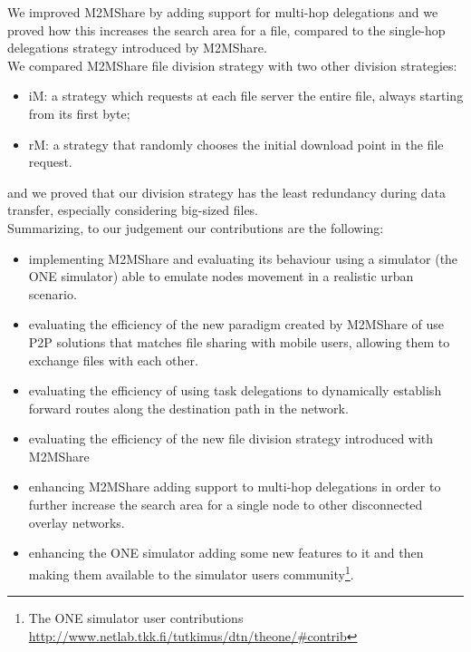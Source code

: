 We improved M2MShare by adding support for multi-hop delegations and we proved how this increases the search area for a file, compared to the single-hop delegations strategy introduced by M2MShare.
\\

We compared M2MShare file division strategy with two other division strategies:
\begin{itemize}
\item iM: a strategy which requests at each file server the entire file, always starting from its first byte;
\item rM: a strategy that randomly chooses the initial download point in the file request.
\end{itemize}
and we proved that our division strategy has the least redundancy during data transfer, especially considering big-sized files.
\\

Summarizing, to our judgement our contributions are the following:
\begin{itemize}
\item implementing M2MShare and evaluating its behaviour using a simulator (the ONE simulator) able to emulate nodes movement in a realistic urban scenario.
\item evaluating the efficiency of the new paradigm created by M2MShare of use P2P solutions that matches file sharing with mobile users, allowing them to exchange files with each other.
\item evaluating the efficiency of using task delegations to dynamically establish forward routes along the destination path in the network.
\item evaluating the efficiency of the new file division strategy introduced with M2MShare 
\item enhancing M2MShare adding support to multi-hop delegations in order to further increase the search area for a single node to other disconnected overlay networks.
\item enhancing the ONE simulator adding some new features to it and then making them available to the simulator users community\footnote{The ONE simulator user contributions \href{http://www.netlab.tkk.fi/tutkimus/dtn/theone/#contrib}{http://www.netlab.tkk.fi/tutkimus/dtn/theone/#contrib}}.
\end{itemize}


